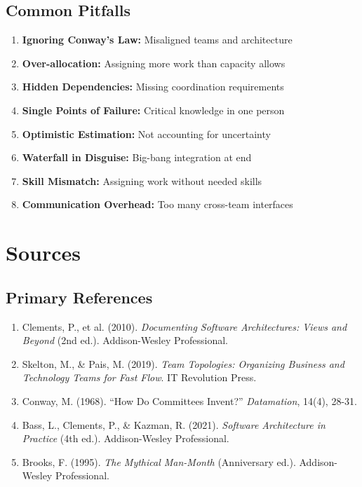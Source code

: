 \documentclass[11pt,letterpaper]{article}
\begin{document}
\subsection{Common Pitfalls}

\begin{warningbox}
\begin{enumerate}[nosep]
    \item \textbf{Ignoring Conway's Law:} Misaligned teams and architecture
    \item \textbf{Over-allocation:} Assigning more work than capacity allows
    \item \textbf{Hidden Dependencies:} Missing coordination requirements
    \item \textbf{Single Points of Failure:} Critical knowledge in one person
    \item \textbf{Optimistic Estimation:} Not accounting for uncertainty
    \item \textbf{Waterfall in Disguise:} Big-bang integration at end
    \item \textbf{Skill Mismatch:} Assigning work without needed skills
    \item \textbf{Communication Overhead:} Too many cross-team interfaces
\end{enumerate}
\end{warningbox}

\section{Sources}

\subsection{Primary References}

\begin{enumerate}
    \item Clements, P., et al. (2010). \textit{Documenting Software Architectures: Views and Beyond} (2nd ed.). Addison-Wesley Professional.
    
    \item Skelton, M., \& Pais, M. (2019). \textit{Team Topologies: Organizing Business and Technology Teams for Fast Flow}. IT Revolution Press.
    
    \item Conway, M. (1968). ``How Do Committees Invent?'' \textit{Datamation}, 14(4), 28-31.
    
    \item Bass, L., Clements, P., \& Kazman, R. (2021). \textit{Software Architecture in Practice} (4th ed.). Addison-Wesley Professional.
    
    \item Brooks, F. (1995). \textit{The Mythical Man-Month} (Anniversary ed.). Addison-Wesley Professional.
\end{enumerate}
\end{document}
